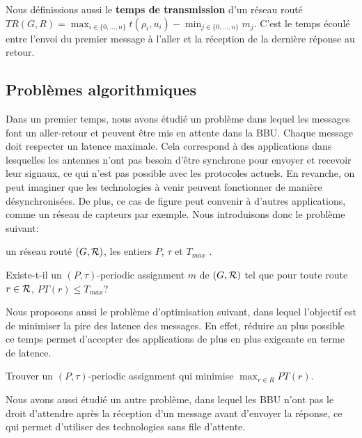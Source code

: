 \documentclass{article}
\begin{document}
      Nous définissions aussi le {\bf temps de transmission} d'un réseau routé $TR(G,R) = \displaystyle \max_{i \in \{0,\ldots,n\}} t(\rho_i,u_i) - \displaystyle \min_{j \in \{0,\ldots,n\}} m_j$. C'est le temps écoulé entre l'envoi du premier message à l'aller et la réception de la dernière réponse au retour.
        
\subsection{Problèmes algorithmiques}

	Dans un premier temps, nous avons étudié un problème dans lequel les messages font un aller-retour et peuvent être mis en attente dans la BBU. Chaque message doit respecter un latence maximale. Cela correspond à des applications dans lesquelles les antennes n'ont pas besoin d'être synchrone pour envoyer et recevoir leur signaux, ce qui n'est pas possible avec les protocoles actuels. En revanche, on peut imaginer que les technologies à venir peuvent fonctionner de manière désynchronisées. De plus, ce cas de figure peut convenir à d'autres applications, comme un réseau de capteurs par exemple. Nous introduisons donc le problème suivant:


       un réseau routé $(G,{\cal R})$, les entiers $P$, $\tau$ et $T_{max}$ .
      
       Existe-t-il un $(P,\tau)$-periodic assignment $m$ de $(G,{\cal R})$ tel que pour toute route $r \in {\cal R}$, $PT(r) \leq T_{max}$?
      
      Nous proposons aussi le problème d'optimisation suivant, dans lequel l'objectif est de minimiser la pire des latence des messages. En effet, réduire au plus possible ce temps permet d'accepter des applications de plus en plus exigeante en terme de latence.
      
        Trouver un $(P,\tau)$-periodic assignment qui minimise $\displaystyle \max_{r \in R} PT(r)$.
      
      Nous avons aussi étudié un autre problème, dans lequel les BBU n'ont pas le droit d'attendre après la réception d'un message avant d'envoyer la réponse, ce qui permet d'utiliser des technologies sans file d'attente.\\
         
\end{document}
